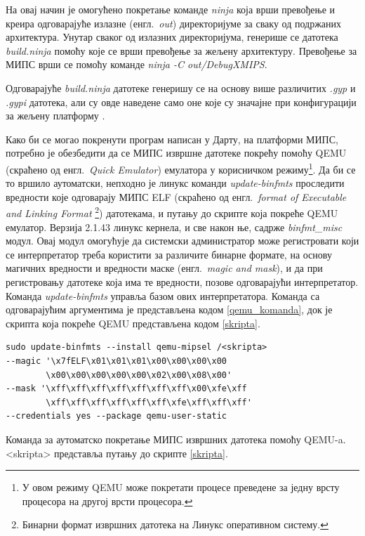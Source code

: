 \documentclass[12pt,oneside]{memoir}
\begin{document}
На овај начин је омогућено покретање команде \textit{ninja} која врши превођење и креира одговарајуће излазне (енгл.~\textit{out}) директоријуме за сваку од подржаних архитектура. Унутар сваког од излазних директоријума, генерише се датотека \textit{build.ninja} помоћу које се врши превођење за жељену архитектуру. Превођење за МИПС врши се помоћу команде \textit{ninja -C out/DebugXMIPS}.

Одговарајуће \textit{build.ninja} датотеке генеришу се на основу више различитих \textit{.gyp} и \textit{.gypi} датотека, али су овде наведене само оне које су значајне при конфигурацији за жељену платформу .

Како би се могао покренути програм написан у Дарту, на платформи МИПС, потребно је обезбедити да се МИПС извршне датотеке покрећу помоћу QEMU (скраћено од енгл.~\textit{Quick Emulator}) емулатора у корисничком режиму\footnote{У овом режиму QEMU може покретати процесе преведене за једну врсту процесора на другој врсти процесора.}. Да би се то вршило аутоматски, непходно је линукс команди \textit{update-binfmts} проследити вредности које одговарају МИПС ELF (скраћено од енгл.~\textit{format of Executable and Linking Format} \footnote{Бинарни формат извршних датотека на Линукс оперативном систему.}) датотекама, и путању до скрипте која покреће QEMU емулатор. Верзија 2.1.43 линукс кернела, и све након ње, садрже \textit{binfmt\_misc} модул. Овај модул омогућује да системски администратор може регистровати који се интерпретатор треба користити за различите бинарне формате, на основу магичних вредности и вредности маске (енгл.~\textit{magic and mask}), и да при регистровању датотеке која има те вредности, позове одговарајући интерпретатор. Команда \textit{update-binfmts} управља базом ових интерпретатора. Команда са одговарајућим аргументима је представљена кодом \ref{qemu_komanda}, док је скрипта која покреће QEMU представљена кодом \ref{skripta}. \\

\begin{listing}
\centering
\begin{verbatim}
sudo update-binfmts --install qemu-mipsel /<skripta>
--magic '\x7fELF\x01\x01\x01\x00\x00\x00\x00
        \x00\x00\x00\x00\x00\x02\x00\x08\x00'
--mask '\xff\xff\xff\xff\xff\xff\xff\x00\xfe\xff
        \xff\xff\xff\xff\xff\xff\xfe\xff\xff\xff'
--credentials yes --package qemu-user-static
\end{verbatim}
\caption{Команда за аутоматско покретање МИПС извршних датотека помоћу QEMU-a. <skripta> представља путању до скрипте \ref{skripta}.}
\label{qemu_komanda}
\end{listing}
\end{document}
